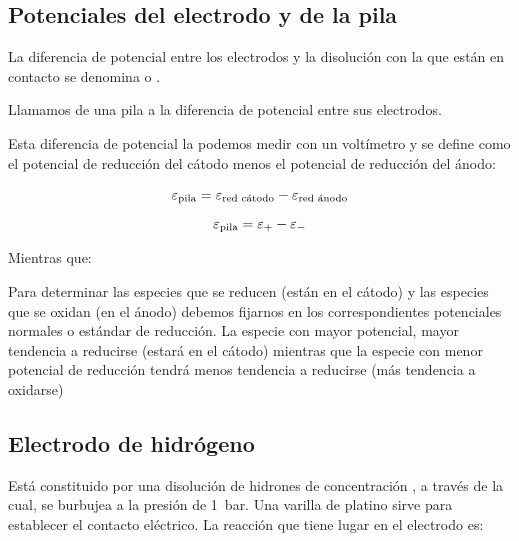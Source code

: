 \subsection{Potenciales del electrodo y de la pila}\label{subsec:potenciales-del-electrodo-y-de-la-pila}

La diferencia de potencial entre los electrodos y la disolución con la que están en contacto se denomina  o .


\begin{center}
    \begin{definition}
        Llamamos  de una pila a la diferencia de potencial entre sus electrodos.
    \end{definition}
\end{center}


Esta diferencia de potencial la podemos medir con un voltímetro y se define como el potencial de reducción del cátodo menos el potencial de reducción del ánodo:

\begin{gather*}
    \varepsilon_{\text{pila}} = \varepsilon_{\text{red cátodo}} - \varepsilon_{\text{red ánodo} } \separ
    \varepsilon_{\text{pila}}  = \varepsilon_+ - \varepsilon_-
\end{gather*}



Mientras que:


Para determinar las especies que se reducen (están en el cátodo) y las especies que se oxidan (en el ánodo) debemos fijarnos en los correspondientes potenciales normales o estándar de reducción.
La especie con mayor potencial, mayor tendencia a reducirse (estará en el cátodo) mientras que la especie con menor potencial de reducción tendrá menos tendencia a reducirse (más tendencia a oxidarse)

\subsection{Electrodo de hidrógeno}\label{subsec:electrodo-de-hidrogeno}

Está constituido por una disolución de hidrones de concentración , a través de la cual, se burbujea  a la presión de \SI{1}{\bar}.
Una varilla de platino sirve para establecer el contacto eléctrico.
La reacción que tiene lugar en el electrodo es:
\begin{centeredequation}
\end{centeredequation}


